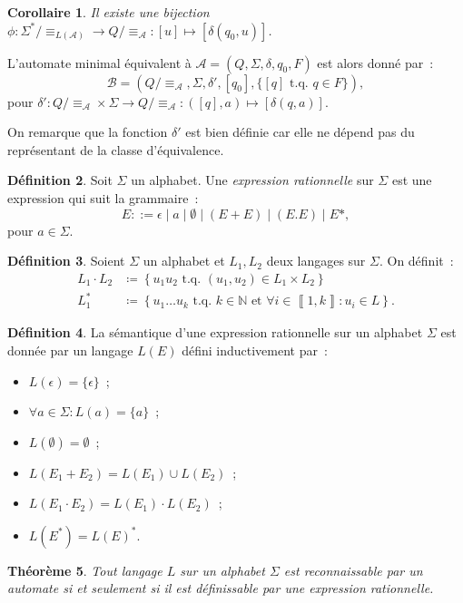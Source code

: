 \documentclass{article}
\newtheorem{thm}{Théorème}[section]
\newtheorem{cor}[thm]{Corollaire}
\theoremstyle{definition}
\newtheorem{déf}[thm]{Définition}
\theoremstyle{remark}
\newcommand{\intint}[2]{\left\llbracket#1, #2\right\rrbracket}
\newcommand{\N}{\mathbb N}
\newcommand{\tq}{\text{ t.q. }}
\newcommand{\automaton}{(Q, \Sigma, \delta, q_0, F)}
\begin{document}
	\begin{cor} Il existe une bijection $\phi : \Sigma^* / \equiv_{L(\mathcal A)} \to Q / \equiv_{\mathcal A} : [u] \mapsto [\delta(q_0, u)]$.
	\end{cor}

	L'automate minimal équivalent à $\mathcal A = \automaton$ est alors donné par~:
	\[\mathcal B = (Q / \equiv_{\mathcal A}, \Sigma, \delta', [q_0], \{[q] \tq q \in F\}),\]
	pour $\delta' : Q / \equiv_{\mathcal A} \times \Sigma \to Q / \equiv_{\mathcal A} : ([q], a) \mapsto [\delta(q, a)]$.

	On remarque que la fonction $\delta'$ est bien définie car elle ne dépend pas du représentant de la classe d'équivalence.

	\begin{déf} Soit $\Sigma$ un alphabet. Une \textit{expression rationnelle} sur $\Sigma$ est une expression qui suit la grammaire~:
	\[E ::= \epsilon \mid a \mid \emptyset \mid (E+E) \mid (E.E) \mid E*,\]
	pour $a \in \Sigma$.
	\end{déf}

	\begin{déf} Soient $\Sigma$ un alphabet et $L_1, L_2$ deux langages sur $\Sigma$. On définit~:
	\begin{align*}
		L_1 \cdot L_2 &\coloneqq \left\{u_1u_2 \tq (u_1, u_2) \in L_1 \times L_2\right\}\\
		L_1^* &\coloneqq \left\{u_1\ldots u_k \tq k \in \N \text{ et } \forall i \in \intint 1k : u_i \in L\right\}.
	\end{align*}
	\end{déf}

	\begin{déf} La sémantique d'une expression rationnelle sur un alphabet $\Sigma$ est donnée par un langage $L(E)$ défini inductivement par~:
	\begin{itemize}
		\item $L(\epsilon) = \{\epsilon\}$~;
		\item $\forall a \in \Sigma : L(a) = \{a\}$~;
		\item $L(\emptyset) = \emptyset$~;
		\item $L(E_1 + E_2) = L(E_1) \cup L(E_2)$~;
		\item $L(E_1\cdot E_2) = L(E_1)\cdot L(E_2)$~;
		\item $L(E^*) = L(E)^*$.
	\end{itemize}
	\end{déf}

	\begin{thm} Tout langage $L$ sur un alphabet $\Sigma$ est reconnaissable par un automate si et seulement si il est définissable par une expression rationnelle.
	\end{thm}
\end{document}

